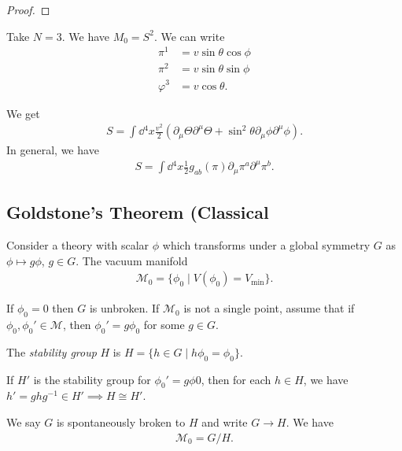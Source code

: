 \begin{proof}
    
\end{proof}

\begin{example}
    Take $N = 3$. We have $M_0 = S^2$. We can write
    \begin{align}
        \pi^{1} &= v \sin \theta \cos \phi \\
        \pi^2 &= v \sin \theta \sin \phi \\
        \varphi^{3} &= v \cos \theta 
    .\end{align}

    We get
    \begin{align}
        S = \int \dd{^{4}x} \frac{v^2}{2} \left( \partial_\mu \Theta \partial^{\mu} \Theta + \sin^2 \theta \partial_\mu \phi \partial^{\mu} \phi \right)
    .\end{align}
    In general, we have
    \begin{align}
        S = \int \dd{^{4}x} \frac{1}{2} g_{ab}\left( \pi \right) \partial_\mu \pi^{a} \partial^{\mu} \pi^{b}
    .\end{align}
\end{example}

\subsection{Goldstone's Theorem (Classical}

Consider a theory with scalar $\phi$ which transforms under a global symmetry $G$ as $\phi \mapsto g \phi$, $g \in G$. The vacuum manifold
\begin{align}
    \mathcal{M}_0 = \{\phi_0  \mid V\left( \phi_0 \right) = V_\text{min}\} 
.\end{align}

If $\phi_0 = 0$ then $G$ is unbroken. If $\mathcal{M}_0$ is not a single point, assume that if $\phi_0, \phi_0' \in \mathcal{M}$, then $\phi_0' = g \phi_0$ for some $g \in G$.

The \emph{stability group} $H$ is $H = \{h \in G  \mid h \phi_0 = \phi_0\} $.

\begin{note}
    If $H'$ is the stability group for $\phi_0' = g \phi0$, then for each $h \in H$, we have $h' = g h g^{-1} \in H' \implies H \cong H'$.
\end{note}

We say $G$ is spontaneously broken to $H$ and write $G \to H$. We have
\begin{align}
    \mathcal{M}_0 = G / H
.\end{align}

